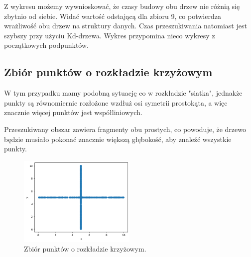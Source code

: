 \documentclass{lab}
\begin{document}
Z wykresu możemy wywnioskować, że czasy budowy obu drzew nie różnią się zbytnio od siebie. Widać wartość odstającą dla zbioru 9, co potwierdza wrażliwość obu drzew na struktury danych. Czas przeszukiwania natomiast jest szybszy przy użyciu Kd-drzewa. Wykres przypomina nieco wykresy z początkowych podpunktów.

\newpage
\subsection{Zbiór punktów o rozkładzie krzyżowym}
W tym przypadku mamy podobną sytuację co w rozkładzie "siatka", jednakże punkty są równomiernie rozłożone wzdłuż osi symetrii prostokąta, a więc znacznie więcej punktów jest współliniowych.

Przeszukiwany obszar zawiera fragmenty obu prostych, co powoduje, że drzewo będzie musiało pokonać znacznie większą głębokość, aby znaleźć wszystkie punkty.

\begin{figure}[H]
  \centering
  \includegraphics[width=0.5\textwidth]{resources/cross.png}
  \caption{Zbiór punktów o rozkładzie krzyżowym.}
  \label{fig:cross}
\end{figure}
\end{document}
